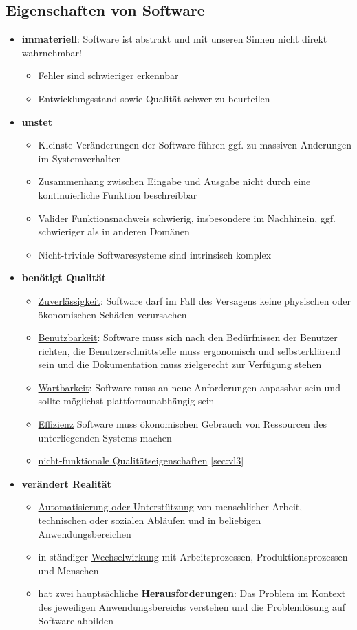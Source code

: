 \documentclass[main.tex]{subfiles}
\begin{document}
\subsection*{Eigenschaften von Software}
\begin{itemize}
    \item \textbf{immateriell}: Software ist abstrakt und mit unseren Sinnen nicht direkt wahrnehmbar!
    \begin{itemize}
        \item Fehler sind schwieriger erkennbar
        \item Entwicklungsstand sowie Qualität schwer zu beurteilen
    \end{itemize}
    \item \textbf{unstet}
    \begin{itemize}
        \item Kleinste Veränderungen der Software führen ggf. zu massiven Änderungen im Systemverhalten
        \item Zusammenhang zwischen Eingabe und Ausgabe nicht durch eine kontinuierliche Funktion beschreibbar
        \item Valider Funktionsnachweis schwierig, insbesondere im Nachhinein, ggf. schwieriger als in anderen Domänen
        \item Nicht-triviale Softwaresysteme sind intrinsisch komplex
    \end{itemize}
    \item \textbf{benötigt Qualität}
    \begin{itemize}
        \item \underline{Zuverlässigkeit}: Software darf im Fall des Versagens keine physischen oder ökonomischen Schäden verursachen
        \item \underline{Benutzbarkeit}: Software muss sich nach den Bedürfnissen der Benutzer richten, die Benutzerschnittstelle muss ergonomisch und selbsterklärend sein und die Dokumentation muss zielgerecht zur Verfügung stehen
        \item \underline{Wartbarkeit}: Software muss an neue Anforderungen anpassbar sein und sollte möglichst plattformunabhängig sein
        \item \underline{Effizienz} Software muss ökonomischen Gebrauch von Ressourcen des unterliegenden Systems machen
        \item \underline{nicht-funktionale Qualitätseigenschaften} \ref{sec:vl3}
    \end{itemize}
    \item \textbf{verändert Realität}
    \begin{itemize}
        \item \underline{Automatisierung oder Unterstützung} von menschlicher Arbeit, technischen oder sozialen Abläufen und in beliebigen Anwendungsbereichen
        \item in ständiger \underline{Wechselwirkung} mit Arbeitsprozessen, Produktionsprozessen und Menschen 
        \item hat zwei hauptsächliche \textbf{Herausforderungen}: Das Problem im Kontext des jeweiligen Anwendungsbereichs verstehen und die Problemlösung auf Software abbilden
    \end{itemize}
\end{itemize}
\end{document}
